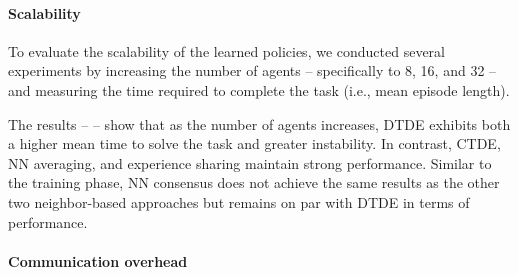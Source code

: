 \documentclass[sigconf]{acmart}
\begin{document}
\paragraph{Scalability}
To evaluate the scalability of the learned policies, we conducted several experiments by increasing the number 
 of agents -- specifically to 8, 16, and 32 -- and measuring the time required to complete the task 
 (i.e., mean episode length). 

The results --  -- show that as the number of agents increases, DTDE exhibits both a higher mean time 
 to solve the task and greater instability. 
%
In contrast, CTDE, NN averaging, and experience sharing maintain strong performance. 
%
Similar to the training phase, NN consensus does not achieve the same results as the other two neighbor-based 
 approaches but remains on par with DTDE in terms of performance.


\paragraph{Communication overhead}

\end{document}
